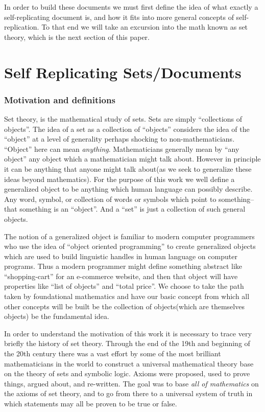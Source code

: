 \documentclass[12pt,a4paper]{amsart}
\numberwithin{equation}{section}
\begin{document}
In order to build these documents we must first define the idea of what
exactly a self-replicating document is, and how it fits into more
general concepts of self-replication. To that end we will take an
excursion into the math known as set theory, which is the next section
of this paper.

\section{Self Replicating
Sets/Documents}\label{self-replicating-setsdocuments}

\subsubsection{Motivation and
definitions}\label{motivation-and-definitions}

Set theory, is the mathematical study of sets. Sets are simply
``collections of objects''. The idea of a set as a collection of
``objects'' considers the idea of the ``object'' at a level of
generality perhaps shocking to non-mathematicians. ``Object'' here can
mean \emph{anything}. Mathematicians generally mean by ``any object''
any object which a mathematician might talk about. However in principle
it can be anything that anyone might talk about(as we seek to generalize
these ideas beyond mathematics). For the purpose of this work we well
define a generalized object to be anything which human language can
possibly describe. Any word, symbol, or collection of words or symbols
which point to something--that something is an ``object''. And a ``set''
is just a collection of such general objects.

The notion of a generalized object is familiar to modern computer
programmers who use the idea of ``object oriented programming'' to
create generalized objects which are used to build linguistic handles in
human language on computer programs. Thus a modern programmer might
define something abstract like ``shopping-cart'' for an e-commerce
website, and then that object will have properties like ``list of
objects'' and ``total price''. We choose to take the path taken by
foundational mathematics and have our basic concept from which all other
concepts will be built be the collection of objects(which are themselves
objects) be the fundamental idea.

In order to understand the motivation of this work it is necessary to
trace very briefly the history of set theory. Through the end of the
19th and beginning of the 20th century there was a vast effort by some
of the most brilliant mathematicians in the world to construct a
universal mathematical theory base on the theory of sets and symbolic
logic. Axioms were proposed, used to prove things, argued about, and
re-written. The goal was to base \emph{all of mathematics} on the axioms
of set theory, and to go from there to a universal system of truth in
which statements may all be proven to be true or false.
\end{document}
